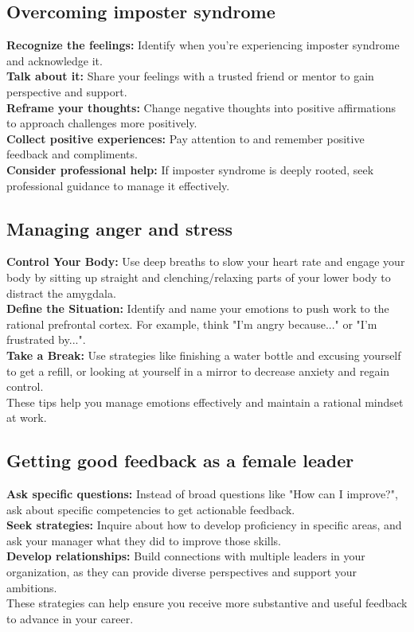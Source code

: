 \documentclass[12pt]{article}
\begin{document}
\subsection{Overcoming imposter syndrome}
\textbf{Recognize the feelings:} Identify when you're experiencing imposter syndrome and acknowledge it.\\
\textbf{Talk about it:} Share your feelings with a trusted friend or mentor to gain perspective and support.\\
\textbf{Reframe your thoughts:} Change negative thoughts into positive affirmations to approach challenges more positively.\\
\textbf{Collect positive experiences:}  Pay attention to and remember positive feedback and compliments.\\
\textbf{Consider professional help:}  If imposter syndrome is deeply rooted, seek professional guidance to manage it effectively.\\

\subsection{Managing anger and stress}
\textbf{Control Your Body:}  Use deep breaths to slow your heart rate and engage your body by sitting up straight and clenching/relaxing parts of your lower body to distract the amygdala.\\
\textbf{Define the Situation:}  Identify and name your emotions to push work to the rational prefrontal cortex. For example, think "I'm angry because..." or "I'm frustrated by...".\\
\textbf{Take a Break:} Use strategies like finishing a water bottle and excusing yourself to get a refill, or looking at yourself in a mirror to decrease anxiety and regain control.\\

These tips help you manage emotions effectively and maintain a rational mindset at work.\\

\subsection{Getting good feedback as a female leader}
\textbf{Ask specific questions:}  Instead of broad questions like "How can I improve?", ask about specific competencies to get actionable feedback.\\
\textbf{Seek strategies:}  Inquire about how to develop proficiency in specific areas, and ask your manager what they did to improve those skills.\\
\textbf{Develop relationships:}  Build connections with multiple leaders in your organization, as they can provide diverse perspectives and support your ambitions.\\
These strategies can help ensure you receive more substantive and useful feedback to advance in your career.
\end{document}

